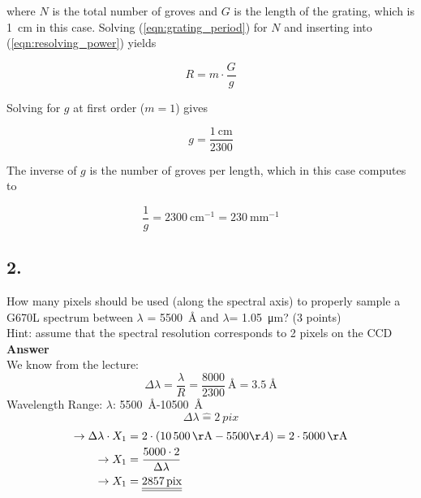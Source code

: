 \documentclass[11pt,a4paper,twoside]{article}
\begin{document}
where $N$ is the total number of groves and $G$ is the length of the grating, 
which is \SI{1}{\cm} in this case. Solving (\ref{eqn:grating_period}) 
for $N$ and inserting into (\ref{eqn:resolving_power}) yields 

\begin{equation}
 R = m \cdot \frac{G}{g}
\end{equation}

Solving for $g$ at first order ($m = 1$) gives 

\begin{equation}
 g = \frac{\SI{1}{\cm}}{2300}
\end{equation}

The inverse of $g$ is the number of groves per length, which in this case computes to 

\begin{equation}
 \frac{1}{g} = \SI{2300}{\cm^{-1}} = \SI{230}{\mm^{-1}}
\end{equation}
\subsection*{2.} How many pixels should be used (along the spectral axis) to properly sample a G670L spectrum between $\lambda$ = \SI{5500}{\angstrom} and  $\lambda$= \SI{1.05}{\micro\metre}? (3 points)\\
Hint: assume that the spectral resolution corresponds to 2 pixels on the CCD\\
\textbf{Answer}\\
We know from the lecture:
\begin{equation}
\Delta\lambda=\frac{\lambda}{R}=\frac{8000}{2300}\SI{}{\angstrom}=\SI{3.5}{\angstrom}
\end{equation}
Wavelength Range: $\lambda$: \SI{5500}{\angstrom}-\SI{10500}{\angstrom}
\begin{equation}
\Delta\lambda \hat{=} \SI{2}{pix}
\end{equation}
\begin{align*}
\rightarrow \Delta\lambda\cdot X_1&=2\cdot(\SI{10500}{\angstrom}-5500\AA)=2\cdot \SI{5000}{\angstrom}\\
\rightarrow X_1&=\frac{5000\cdot 2}{\Delta\lambda}\\
\rightarrow X_1&=\underline{\underline{\SI{2857}{pix}}}
\end{align*}
\\
\end{document}
